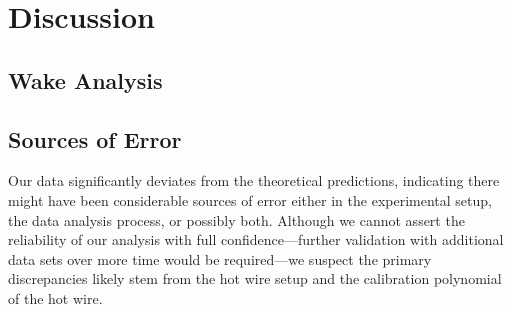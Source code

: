 \chapter{Discussion}
\label{cp:discussion}
\section{Wake Analysis}


\section{Sources of Error} \label{sec:error}

Our data significantly deviates from the theoretical predictions, indicating there might have been considerable sources of error either in the experimental setup, the data analysis process, or possibly both. Although we cannot assert the reliability of our analysis with full confidence—further validation with additional data sets over more time would be required—we suspect the primary discrepancies likely stem from the hot wire setup and the calibration polynomial of the hot wire.